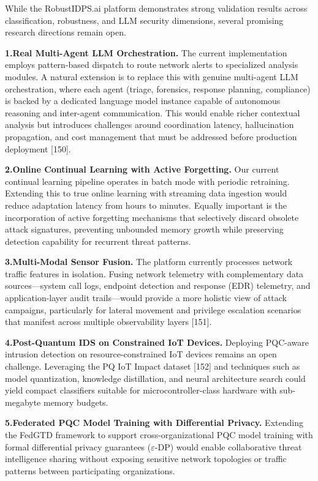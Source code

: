 While the RobustIDPS.ai platform demonstrates strong validation results
across classification, robustness, and LLM security dimensions, several
promising research directions remain open.

\textbf{1.\;Real Multi-Agent LLM Orchestration.} The current implementation
employs pattern-based dispatch to route network alerts to specialized
analysis modules. A natural extension is to replace this with genuine
multi-agent LLM orchestration, where each agent (triage, forensics,
response planning, compliance) is backed by a dedicated language model
instance capable of autonomous reasoning and inter-agent communication.
This would enable richer contextual analysis but introduces challenges
around coordination latency, hallucination propagation, and cost management
that must be addressed before production deployment [150].

\textbf{2.\;Online Continual Learning with Active Forgetting.} Our current
continual learning pipeline operates in batch mode with periodic
retraining. Extending this to true online learning with streaming data
ingestion would reduce adaptation latency from hours to minutes. Equally
important is the incorporation of active forgetting mechanisms that
selectively discard obsolete attack signatures, preventing unbounded memory
growth while preserving detection capability for recurrent threat patterns.

\textbf{3.\;Multi-Modal Sensor Fusion.} The platform currently processes
network traffic features in isolation. Fusing network telemetry with
complementary data sources---system call logs, endpoint detection and
response (EDR) telemetry, and application-layer audit trails---would provide
a more holistic view of attack campaigns, particularly for lateral movement
and privilege escalation scenarios that manifest across multiple
observability layers [151].

\textbf{4.\;Post-Quantum IDS on Constrained IoT Devices.} Deploying
PQC-aware intrusion detection on resource-constrained IoT devices remains
an open challenge. Leveraging the PQ IoT Impact dataset [152] and
techniques such as model quantization, knowledge distillation, and
neural architecture search could yield compact classifiers suitable for
microcontroller-class hardware with sub-megabyte memory budgets.

\textbf{5.\;Federated PQC Model Training with Differential Privacy.}
Extending the FedGTD framework to support cross-organizational PQC model
training with formal differential privacy guarantees ($\varepsilon$-DP)
would enable collaborative threat intelligence sharing without exposing
sensitive network topologies or traffic patterns between participating
organizations.

